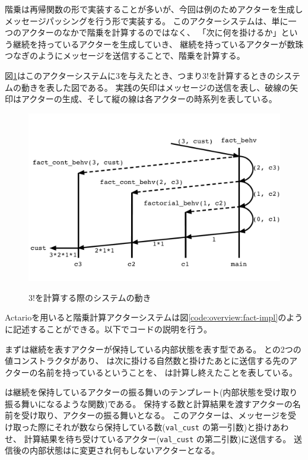 階乗は再帰関数の形で実装することが多いが、今回は例のためアクターを生成しメッセージパッシングを行う形で実装する。
このアクターシステムは、単に一つのアクターのなかで階乗を計算するのではなく、
「次に何を掛けるか」という継続を持っているアクターを生成していき、
継続を持っているアクターが数珠つなぎのようにメッセージを送信することで、階乗を計算する。

図\ref{img:overview:fact}はこのアクターシステムに$3$を与えたとき、つまり$3!$を計算するときのシステムの動きを表した図である。
実践の矢印はメッセージの送信を表し、破線の矢印はアクターの生成、そして縦の線は各アクターの時系列を表している。

\begin{figure}[tp]
  \centering
  \includegraphics[width=15cm]{./img/overview/fact.pdf}
  \label{img:overview:fact}
  \caption{$3!$を計算する際のシステムの動き}
\end{figure}

Actarioを用いると階乗計算アクターシステムは図\ref{code:overview:fact-impl}のように記述することができる。以下でコードの説明を行う。

まずは継続を表すアクターが保持している内部状態を表す型である。
との2つの値コンストラクタがあり、
は次に掛ける自然数と掛けたあとに送信する先のアクターの名前を持っているということを、
は計算し終えたことを表している。

は継続を保持しているアクターの振る舞いのテンプレート(内部状態を受け取り振る舞いになるような関数)である。
保持する数と計算結果を渡すアクターの名前を受け取り、アクターの振る舞いとなる。
このアクターは、メッセージを受け取った際にそれが数なら保持している数(\lstinline{val_cust} の第一引数)と掛けあわせ、
計算結果を待ち受けているアクター(\lstinline{val_cust} の第二引数)に送信する。
送信後の内部状態はに変更され何もしないアクターとなる。

